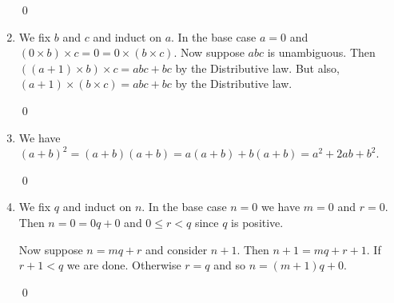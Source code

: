 \begin{enumerate}[Ex. 2.3.1.]
    \qed

    \item We fix $b$ and $c$ and induct on $a$. In the base case $a = 0$ and
    $(0 \times b) \times c = 0 = 0 \times (b \times c)$. Now suppose $abc$ is
    unambiguous. Then $((a+1) \times b) \times c = abc + bc$ by the
    Distributive law. But also, $(a+1) \times (b \times c) = abc + bc$ by
    the Distributive law.

    \qed

    \item We have $(a+b)^2 = (a+b)(a+b) = a(a+b) + b(a+b) = a^2 + 2ab + b^2$.

    \qed

    \item We fix $q$ and induct on $n$. In the base case $n = 0$ we have
    $m = 0$ and $r = 0$. Then $n = 0 = 0q + 0$ and $0 \leq r < q$ since $q$
    is positive.

    Now suppose $n = mq + r$ and consider $n+1$. Then $n+1 = mq + r + 1$. If
    $r + 1 < q$ we are done. Otherwise $r = q$ and so $n = (m+1)q + 0$.

    \qed

\end{enumerate}
